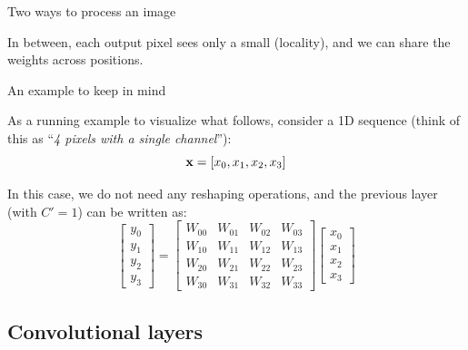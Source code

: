 \documentclass[11pt,aspectratio=169]{beamer}
\begin{document}
\begin{frame}{Two ways to process an image}
    \centering
    

    \vspace{0.5em}
    \raggedright
    In between, each output pixel sees only a small 
    (locality), and we can share the weights across positions.
\end{frame}

\begin{frame}{An example to keep in mind}
    \setlength{\arraycolsep}{7pt}

    As a running example to visualize what follows, consider a 1D sequence (think of this as “\textit{4 pixels with a single channel}”):
    \[
        \boldsymbol{\mathbf{x}} = \left[x_0, x_1, x_2, x_3\right]
    \]

    In this case, we do not need any reshaping operations, and the previous layer (with $C' = 1$) can be written as:
    \[
        \begin{bmatrix} y_0 \\ y_1 \\ y_2 \\ y_3 \end{bmatrix}=\begin{bmatrix}W_{00} & W_{01} & W_{02} & W_{03} \\ W_{10} & W_{11} & W_{12} & W_{13} \\ W_{20} & W_{21} & W_{22} & W_{23} \\ W_{30} & W_{31} & W_{32} & W_{33} \end{bmatrix} \begin{bmatrix} x_0 \\ x_1 \\ x_2 \\ x_3 \end{bmatrix}
    \]

\end{frame}

\subsection{Convolutional layers}
\end{document}
